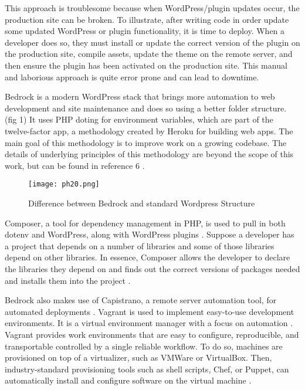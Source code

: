 This approach is troublesome because when WordPress/plugin updates
occur, the production site can be broken. To illustrate, after writing
code in order update some updated WordPress or plugin functionality, it
is time to deploy. When a developer does so, they must install or update
the correct version of the plugin on the production site, compile
assets, update the theme on the remote server, and then ensure the
plugin has been activated on the production site. This manual and
laborious approach is quite error prone and can lead to downtime.

Bedrock is a modern WordPress stack that brings more automation to web
development and site maintenance and does so using a better folder
structure. (fig 1) It uses PHP doting for environment variables, which
are part of the twelve-factor app, a methodology created by Heroku for
building web apps\cite{p5}. The main goal of this methodology is to
improve work on a growing codebase. The details of underlying principles
of this methodology are beyond the scope of this work, but can be found
in reference 6 \cite{p8} .

\begin{figure}[H]
      \centering
      \texttt{[image: ph20.png]}
      \caption{Difference between Bedrock and standard Wordpress Structure}
 \end{figure}

Composer, a tool for dependency management in PHP, is used to pull in
both dotenv and WordPress, along with WordPress plugins \cite{p7} .
Suppose a developer has a project that depends on a number of libraries
and some of those libraries depend on other libraries. In essence,
Composer allows the developer to declare the libraries they depend on
and finds out the correct versions of packages needed and installs them
into the project \cite{p8} .

Bedrock also makes use of Capistrano, a remote server automation tool,
for automated deployments \cite{p9}. Vagrant is used to implement
easy-to-use development environments. It is a virtual environment
manager with a focus on automation \cite{p10} . Vagrant provides work
environments that are easy to configure, reproducible, and transportable
controlled by a single reliable workflow. To do so, machines are
provisioned on top of a virtualizer, such as VMWare or VirtualBox. Then,
industry-standard provisioning tools such as shell scripts, Chef, or
Puppet, can automatically install and configure software on the virtual
machine \cite{p10} .

